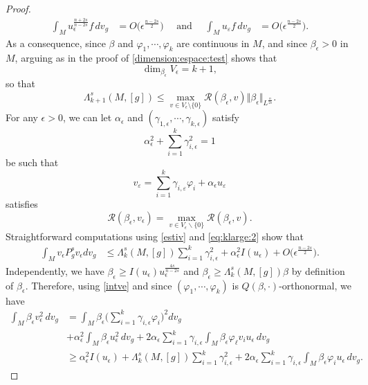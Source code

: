\documentclass[10pt]{amsart}
\numberwithin{equation}{section}
\def\al{{\alpha}}
\def\La{{\Lambda}}
\def\ep{{\varepsilon}}
\newcommand{\ve}{\varepsilon}
\newcommand{\vp}{\varphi}
\def \ep{\epsilon}
\theoremstyle{plain}
\theoremstyle{remark}
\begin{document}
\begin{proof}
\begin{equation}
\begin{aligned}
\int_{M} u_{\ep}^{\frac{n+2s}{n-2s}}f\, dv_g & = O  \big(\ep^{\frac{n-2s}{2}} \big) \quad \text{ and } \quad  
\int_{M}  u_\ve f \, dv_g  & = O  \big(\ep^{\frac{n-2s}{2}} \big).
\end{aligned}
\end{equation}
As a consequence, since $\beta$ and $\vp_1, \cdots, \vp_k$ are continuous in $M$,  and since $\beta_\ep>0$ in $M$, arguing as in  the proof of \eqref{dimension:espace:test} shows that
$$ \dim_{\beta_\ep} V_\ep = k+1, $$
so that 
\begin{equation} \label{eq:klarge:2bis}
\La_{k+1}^s(M,[g]) \leq \max_{v\in V_\ep \setminus \{0\}}\mathcal{R}(\beta_\ep,v) \Vert \beta_\ep \Vert_{L^\frac{n}{2s}}.
\end{equation}
For any $\ep >0$, we can let $\alpha_\ep$ and $(\gamma_{1,\ep}, \cdots, \gamma_{k,\ep})$ satisfy 
$$ \alpha_\ep^2 + \sum_{i=1}^k \gamma_{i,\ep}^2 = 1$$
be such that 
 \begin{equation*} 
 	v_\ve=\sum_{i=1}^{k}\gamma_{i,\ve} \vp_i +\alpha_\ep u_{\ve}
 \end{equation*}
satisfies
 \begin{equation*}
 	\mathcal{R}(\beta_\ep, v_\ep) = \max_{v \in V_\ep \backslash \{0\}} \mathcal{R}(\beta_\ep, v). 
	\end{equation*}
Straightforward computations using \eqref{estiv} and \eqref{eq:klarge:2} show that 
\begin{equation}   \label{eq:klarge:3}
\begin{aligned}
  \int_{M} v_\ep P_g^s v_\ep dv_g & \le \Lambda_k^s(M,[g]) \sum_{i=1}^{k}\gamma_{i,\ep}^2+ \alpha_{\ep}^2 I(u_\ep) + O  \big(\ep^{\frac{n-2s}{2}} \big) .
\end{aligned} 
\end{equation}
Independently, we have $\beta_\ep  \geq I(u_\ep) u_\ep^{\frac{4s}{n-2s}}$ and $\beta_\ep  \geq \La_k^s(M,[g]) \beta$ by definition of $\beta_\ep$. Therefore, using \eqref{intve} and since $(\vp_1, \cdots, \vp_k)$ is $Q(\beta,\cdot)$-orthonormal, we have 
\begin{equation}   \label{eq:klarge:4}
\begin{aligned}
\int_M \beta_\ep v_\ep^2  \,dv_g & =   \int_{M} \beta_\ep \big( \sum_{i=1}^{k} \gamma_{i, \ep} \vp_i \big)^2dv_g \\
	&+ \alpha_{\ep}^2 \int_M \beta_\ep u_\ep^2 \, dv_g + 2\alpha_{\ep}\sum_{i=1}^{k}\gamma_{i,\ep} \int_{M} \beta_\ep \varphi_{\ell} v_i u_{\ep}\, dv_g  \\
& \geq \al_\ep^2 I(u_\ep)  + \La_k^s(M,[g]) \sum_{i=1}^k \gamma_{i,\ep}^2  + 2\alpha_{\ep}\sum_{i=1}^{k}\gamma_{i,\ep} \int_{M} \beta_\ep \vp_i u_{\ep}\, dv_g. 

\end{aligned}
\end{equation}
\end{proof}
\end{document}
